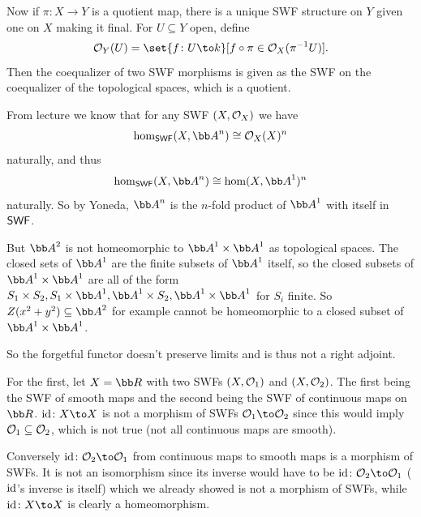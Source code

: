     Now if $\pi\colon X\to Y$ is a quotient map, there is a unique SWF structure on $Y$ given one on $X$ making it final.
    For $U\subseteq Y$ open, define
    $$ \O_Y(U) = \set{f\colon U\to k}[f\circ\pi\in\O_X(\pi^{-1}U)] . $$
    Then the coequalizer of two SWF morphisms is given as the SWF on the coequalizer of the topological spaces, which is a
    quotient.

    \item From lecture we know that for any SWF $(X,{{\cal O}}_X)$ we have
    $$ \hom_\SWF(X,\bA^n) \cong \O_X(X)^n $$
    naturally, and thus
    $$ \hom_\SWF(X,\bA^n) \cong \hom(X,\bA^1)^n $$
    naturally.
    So by Yoneda, $\bA^n$ is the $n$-fold product of $\bA^1$ with itself in ${\sf SWF}$.

    But $\bA^2$ is not homeomorphic to $\bA^1\times\bA^1$ as topological spaces.
    The closed sets of $\bA^1$ are the finite subsets of $\bA^1$ itself, so the closed subsets of $\bA^1\times\bA^1$ are all of the form
    $S_1\times S_2,S_1\times\bA^1,\bA^1\times S_2,\bA^1\times\bA^1$ for $S_i$ finite.
    So $Z(x^2+y^2)\subseteq\bA^2$ for example cannot be homeomorphic to a closed subset of $\bA^1\times\bA^1$.

    So the forgetful functor doesn't preserve limits and is thus not a right adjoint.

    \item

    \item For the first, let $X=\bR$ with two SWFs $(X,{{\cal O}}_1)$ and $(X,{{\cal O}}_2)$.
    The first being the SWF of smooth maps and the second being the SWF of continuous maps on $\bR$.
    $\id\colon X\to X$ is not a morphism of SWFs $\O_1\to\O_2$ since this would imply ${{\cal O}}_1\subseteq{{\cal O}}_2$, which is not true (not all continuous
    maps are smooth).

    Conversely $\id\colon\O_2\to\O_1$ from continuous maps to smooth maps is a morphism of SWFs.
    It is not an isomorphism since its inverse would have to be $\id\colon\O_2\to\O_1$ (${\rm id}$'s inverse is itself) which we already showed is
    not a morphism of SWFs, while $\id\colon X\to X$ is clearly a homeomorphism.
\eenum

\bprob


